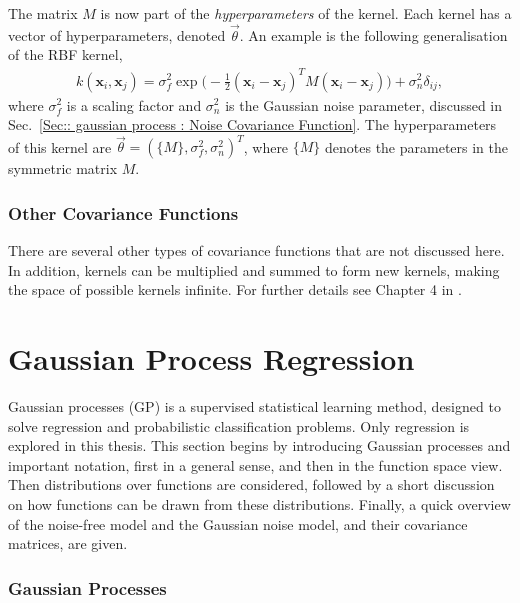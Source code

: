 \documentclass[twoside,english]{uiofysmaster}
\begin{document}
{{The matrix $M$ is now part of the \textit{hyperparameters} of the kernel. Each kernel has a vector of hyperparameters, denoted $\vec{\theta}$. An example is the following generalisation of the RBF kernel, 
\begin{align}
k(\textbf{x}_i, \textbf{x}_j) = \sigma_f^2 \exp \big(- \frac{1}{2} (\textbf{x}_i - \textbf{x}_j)^T M (\textbf{x}_i - \textbf{x}_j) \big) + \sigma_n^2 \delta_{ij},
\end{align}
where $\sigma_f^2$ is a scaling factor and $\sigma_n^2$ is the Gaussian noise parameter, discussed in Sec.~\ref{Sec:: gaussian process : Noise Covariance Function}. The hyperparameters of this kernel are $\vec{\theta} = (\{M\}, \sigma^2_f, \sigma_n^2)^T$, where $\{M\}$ denotes the parameters in the symmetric matrix $M$. 

\subsubsection{Other Covariance Functions}

There are several other types of covariance functions that are not discussed here. In addition, kernels can be multiplied and summed to form new kernels, making the space of possible kernels infinite. For further details see Chapter 4 in \cite{rasmussen2006gaussian}.




\section{Gaussian Process Regression}\label{Sec: gaussian process : Gaussian Process Regression}

Gaussian processes (GP) is a supervised statistical learning method, designed to solve regression and probabilistic classification problems. Only regression is explored in this thesis. This section begins by introducing Gaussian processes and important notation, first in a general sense, and then in the function space view. Then distributions over functions are considered, followed by a short discussion on how functions can be drawn from these distributions. Finally, a quick overview of the noise-free model and the Gaussian noise model, and their covariance matrices, are given.

\subsubsection{Gaussian Processes}\label{Sec:: gaussian process : Gaussian Processes}

}}
\end{document}
